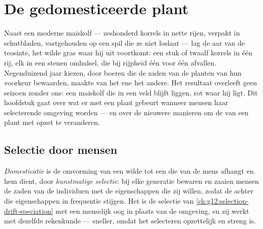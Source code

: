 \chapter{De gedomesticeerde plant}\label{ch:g12:domesticated-plants}

Naast een moderne maiskolf --- zeshonderd korrels in nette rijen,
verpakt in schutbladen, vastgehouden op een spil die ze niet loslaat ---
lag de aar van de teosinte, het wilde gras waar hij uit voortkomt: een
stuk of twaalf korrels in één rij, elk in een stenen omhulsel, die bij
rijpheid één voor één afvallen. Negenduizend jaar kiezen, door boeren die
de zaden van de planten van hun voorkeur bewaarden, maakte van het ene het
andere. Het resultaat overleeft geen seizoen zonder ons: een maiskolf die
in een veld blijft liggen, rot waar hij ligt. Dit hoofdstuk gaat over wat
er met een plant gebeurt wanneer mensen haar selecterende omgeving worden
--- en over de nieuwere manieren om de  van een plant met opzet te
veranderen.

\section{Selectie door mensen}

\begin{definition}\label{def:g12:domesticated-plants:domestication}
\emph{Domesticatie} is de omvorming van een wilde
 tot een  die van de mens afhangt en hem dient, door
\emph{kunstmatige selectie}: bij elke
generatie bewaren en zaaien mensen de zaden van de individuen met de
eigenschappen die zij willen, zodat de  achter die eigenschappen in
frequentie stijgen. Het is de selectie van
\cref{ch:g12:selection-drift-speciation} met een menselijk oog in plaats
van de omgeving, en zij werkt met dezelfde rekenkunde --- sneller, omdat
het selecteren opzettelijk en streng is.
\end{definition}

